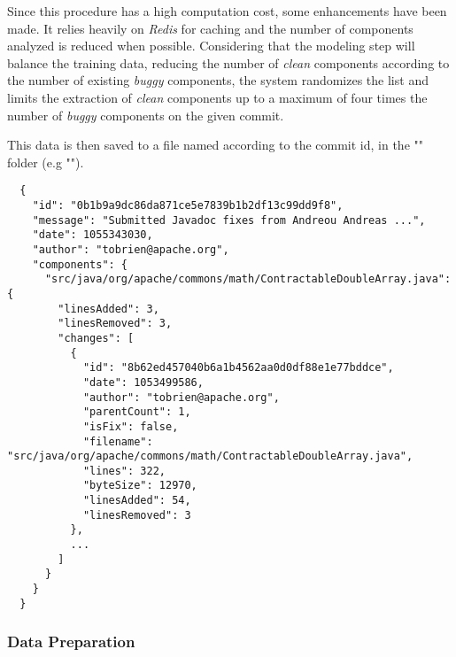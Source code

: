 Since this procedure has a high computation cost, some enhancements have been made. It relies heavily on \emph{Redis} for caching 
and the number of components analyzed is reduced when possible. Considering that the modeling step will balance the training data, 
reducing the number of \emph{clean} components according to the number of existing \emph{buggy} components, the system randomizes the list and
limits the extraction of \emph{clean} components up to a maximum of four times the number of \emph{buggy} components on the given commit.



This data is then saved to a file named according to the commit id, in the "" folder (e.g "").

\begin{lstlisting}
  {
    "id": "0b1b9a9dc86da871ce5e7839b1b2df13c99dd9f8",
    "message": "Submitted Javadoc fixes from Andreou Andreas ...",
    "date": 1055343030,
    "author": "tobrien@apache.org",
    "components": {
      "src/java/org/apache/commons/math/ContractableDoubleArray.java": {
        "linesAdded": 3,
        "linesRemoved": 3,
        "changes": [
          {
            "id": "8b62ed457040b6a1b4562aa0d0df88e1e77bddce",
            "date": 1053499586,
            "author": "tobrien@apache.org",
            "parentCount": 1,
            "isFix": false,
            "filename": "src/java/org/apache/commons/math/ContractableDoubleArray.java",
            "lines": 322,
            "byteSize": 12970,
            "linesAdded": 54,
            "linesRemoved": 3
          },
          ...
        ]
      }
    }
  }
\end{lstlisting}



\subsubsection{Data Preparation}

